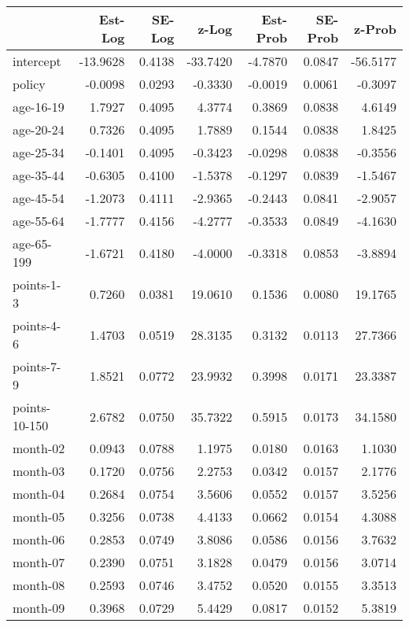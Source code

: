 \documentclass[10pt]{article}
\begin{document}
\begin{table}[ht]
\centering
\begin{tabular}{lrrrrrr}
  \hline
 & Est-Log & SE-Log & z-Log & Est-Prob & SE-Prob & z-Prob \\ 
  \hline
intercept & -13.9628 & 0.4138 & -33.7420 & -4.7870 & 0.0847 & -56.5177 \\ 
  policy & -0.0098 & 0.0293 & -0.3330 & -0.0019 & 0.0061 & -0.3097 \\ 
  age-16-19 & 1.7927 & 0.4095 & 4.3774 & 0.3869 & 0.0838 & 4.6149 \\ 
  age-20-24 & 0.7326 & 0.4095 & 1.7889 & 0.1544 & 0.0838 & 1.8425 \\ 
  age-25-34 & -0.1401 & 0.4095 & -0.3423 & -0.0298 & 0.0838 & -0.3556 \\ 
  age-35-44 & -0.6305 & 0.4100 & -1.5378 & -0.1297 & 0.0839 & -1.5467 \\ 
  age-45-54 & -1.2073 & 0.4111 & -2.9365 & -0.2443 & 0.0841 & -2.9057 \\ 
  age-55-64 & -1.7777 & 0.4156 & -4.2777 & -0.3533 & 0.0849 & -4.1630 \\ 
  age-65-199 & -1.6721 & 0.4180 & -4.0000 & -0.3318 & 0.0853 & -3.8894 \\ 
  points-1-3 & 0.7260 & 0.0381 & 19.0610 & 0.1536 & 0.0080 & 19.1765 \\ 
  points-4-6 & 1.4703 & 0.0519 & 28.3135 & 0.3132 & 0.0113 & 27.7366 \\ 
  points-7-9 & 1.8521 & 0.0772 & 23.9932 & 0.3998 & 0.0171 & 23.3387 \\ 
  points-10-150 & 2.6782 & 0.0750 & 35.7322 & 0.5915 & 0.0173 & 34.1580 \\ 
  month-02 & 0.0943 & 0.0788 & 1.1975 & 0.0180 & 0.0163 & 1.1030 \\ 
  month-03 & 0.1720 & 0.0756 & 2.2753 & 0.0342 & 0.0157 & 2.1776 \\ 
  month-04 & 0.2684 & 0.0754 & 3.5606 & 0.0552 & 0.0157 & 3.5256 \\ 
  month-05 & 0.3256 & 0.0738 & 4.4133 & 0.0662 & 0.0154 & 4.3088 \\ 
  month-06 & 0.2853 & 0.0749 & 3.8086 & 0.0586 & 0.0156 & 3.7632 \\ 
  month-07 & 0.2390 & 0.0751 & 3.1828 & 0.0479 & 0.0156 & 3.0714 \\ 
  month-08 & 0.2593 & 0.0746 & 3.4752 & 0.0520 & 0.0155 & 3.3513 \\ 
  month-09 & 0.3968 & 0.0729 & 5.4429 & 0.0817 & 0.0152 & 5.3819 \\ 

\end{tabular}
\end{table}
\end{document}

